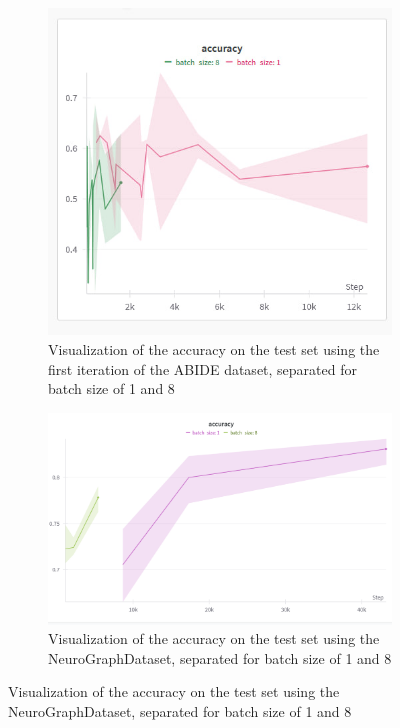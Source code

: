 	
	\begin{figure}[!h]
		\centering
		\begin{subfigure}[b]{0.45\textwidth}
			\centering
			\includegraphics[width=\textwidth]{figures/3site_runs.jpg}
			\caption{Visualization of the accuracy on the test set using the first iteration of the ABIDE dataset, separated for batch size of 1 and 8}
			\label{fig:3site_runs}
		\end{subfigure}
		\hfill
		\begin{subfigure}[b]{0.50\textwidth}
			\centering
			\includegraphics[width=\textwidth]{figures/ng_accuracy.png}
			\caption{Visualization of the accuracy on the test set using the NeuroGraphDataset, separated for batch size of 1 and 8}
			\label{fig:neurograph}
		\end{subfigure}
	\end{figure}
	
